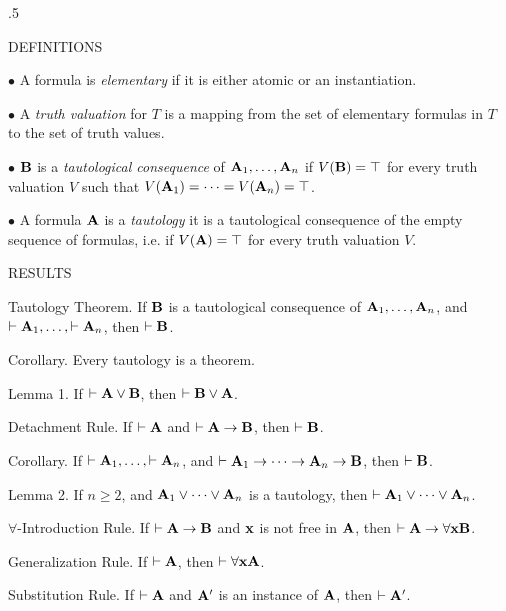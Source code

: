 \vglue .5\baselineskip 

\beginsection DEFINITIONS

\item{$\bullet$} A formula is {\it elementary} if it is either atomic or an instantiation.

\item{$\bullet$} A {\it truth valuation} for $T$ is a mapping from the set of elementary 
formulas in $T$ to the set of truth values.

\item{$\bullet$} ${\bf B}$ is a {\it tautological consequence} of ${\bf A}_1, \dots , {\bf A}_n$ 
if $V({\bf B}) = \top$ for every truth valuation $V$ such that 
$V({\bf A}_1) = \cdots = V({\bf A}_n) = \top$.

\item{$\bullet$} A formula ${\bf A}$ is a {\it tautology} it is a tautological consequence of 
the empty sequence of formulas, i.e. if $V({\bf A}) = \top$ for every truth valuation $V$.

\beginsection RESULTS


\proclaim Tautology Theorem. If ${\bf B}$ is a tautological consequence of ${\bf A}_1, \dots, {\bf A}_n$,
and $\vdash{\bf A}_1, \dots, \vdash {\bf A}_n$, then $\vdash {\bf B}$.

\proclaim Corollary. Every tautology is a theorem.

\proclaim Lemma 1. If $\vdash {\bf A} \lor {\bf B}$, then $\vdash {\bf B} \lor {\bf A}$.

\proclaim Detachment Rule. If $\vdash {\bf A}$ and $\vdash {\bf A} \to {\bf B}$, then $\vdash {\bf B}$.

\proclaim Corollary. If $\vdash {\bf A}_1, \dots, \vdash {\bf A}_n$, and $\vdash {\bf A}_1 \to \dots \to {\bf A}_n \to {\bf B}$, then $\vdash {\bf B}$.

\proclaim Lemma 2. If $n \ge 2$, and ${\bf A}_1 \lor \cdots \lor {\bf A}_n$ is a tautology, then $\vdash {\bf A}_1 \lor \cdots \lor {\bf A}_n$.


\proclaim $\forall$-Introduction Rule. If $\vdash {\bf A} \to {\bf B}$ and ${\bf x}$ is not free in ${\bf A}$, then $\vdash {\bf A} \to \forall{\bf x}{\bf B}$.

\proclaim Generalization Rule. If $\vdash {\bf A}$, then $\vdash \forall{\bf x}{\bf A}$.

\proclaim Substitution Rule. If $\vdash {\bf A}$ and ${\bf A}'$ is an instance of ${\bf A}$, then $\vdash {\bf A}'$.

